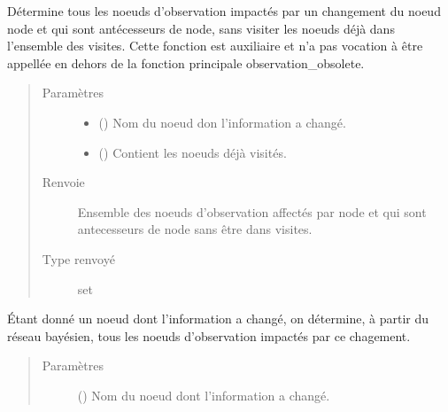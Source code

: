 \documentclass[letterpaper,10pt,french]{sphinxmanual}
\begin{document}
\begin{fulllineitems}
\begin{fulllineitems}
\label{\detokenize{index:DecisionTheoreticTroubleshooting.TroubleShootingProblem.noeud_ant}}
Détermine tous les noeuds d’observation impactés par un changement
du noeud node et qui sont antécesseurs de node, sans visiter les noeuds
déjà dans l’ensemble des visites. Cette fonction est auxiliaire et n’a
pas vocation à être appellée en dehors de la fonction principale
observation\_obsolete.
\begin{quote}\begin{description}
\item[{Paramètres}] \leavevmode\begin{itemize}
\item {} 
 () \textendash{} Nom du noeud don l’information a changé.

\item {} 
 () \textendash{} Contient les noeuds déjà visités.

\end{itemize}

\item[{Renvoie}] \leavevmode
{} \textendash{} Ensemble des noeuds d’observation affectés par node et qui sont
antecesseurs de node sans être dans visites.

\item[{Type renvoyé}] \leavevmode
set

\end{description}\end{quote}

\end{fulllineitems}


\begin{fulllineitems}
\label{\detokenize{index:DecisionTheoreticTroubleshooting.TroubleShootingProblem.observation_obsolete}}
Étant donné un noeud dont l’information a changé, on détermine, à
partir du réseau bayésien, tous les noeuds d’observation impactés par
ce chagement.
\begin{quote}\begin{description}
\item[{Paramètres}] \leavevmode
{} () \textendash{} Nom du noeud dont l’information a changé.


\end{description}
\end{quote}
\end{fulllineitems}
\end{fulllineitems}
\end{document}
